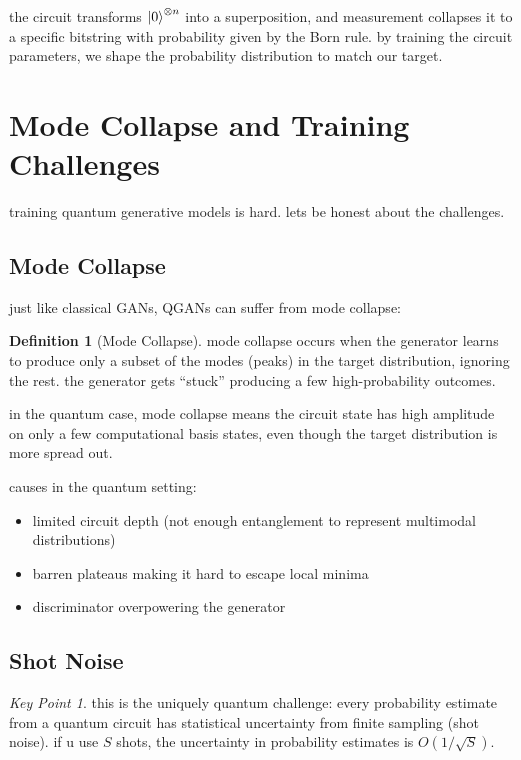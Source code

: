 \documentclass[11pt,a4paper]{article}
\theoremstyle{definition}
\newtheorem{definition}{Definition}[section]
\theoremstyle{remark}
\newtheorem*{keypoint}{Key Point}
\begin{document}
the circuit transforms $\ket{0}^{\otimes n}$ into a superposition, and measurement collapses it to a specific bitstring with probability given by the Born rule. by training the circuit parameters, we shape the probability distribution to match our target.

\section{Mode Collapse and Training Challenges}

training quantum generative models is hard. lets be honest about the challenges.

\subsection{Mode Collapse}

just like classical GANs, QGANs can suffer from mode collapse:

\begin{definition}[Mode Collapse]
mode collapse occurs when the generator learns to produce only a subset of the modes (peaks) in the target distribution, ignoring the rest. the generator gets ``stuck'' producing a few high-probability outcomes.
\end{definition}

in the quantum case, mode collapse means the circuit state has high amplitude on only a few computational basis states, even though the target distribution is more spread out.

causes in the quantum setting:
\begin{itemize}[nosep]
    \item limited circuit depth (not enough entanglement to represent multimodal distributions)
    \item barren plateaus making it hard to escape local minima
    \item discriminator overpowering the generator
\end{itemize}

\subsection{Shot Noise}

\begin{keypoint}
this is the uniquely quantum challenge: every probability estimate from a quantum circuit has statistical uncertainty from finite sampling (shot noise). if u use $S$ shots, the uncertainty in probability estimates is $O(1/\sqrt{S})$.
\end{keypoint}
\end{document}
